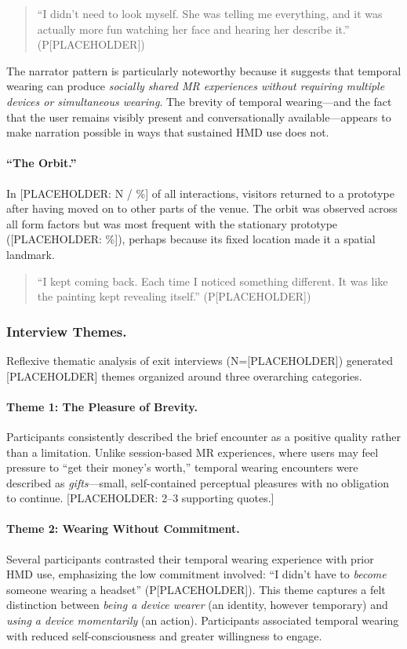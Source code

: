 \begin{quote}
``I didn't need to look myself. She was telling me everything, and it was actually more fun watching her face and hearing her describe it.'' (P[PLACEHOLDER])
\end{quote}

The narrator pattern is particularly noteworthy because it suggests that temporal wearing can produce \textit{socially shared MR experiences without requiring multiple devices or simultaneous wearing}. The brevity of temporal wearing---and the fact that the user remains visibly present and conversationally available---appears to make narration possible in ways that sustained HMD use does not.

\paragraph{``The Orbit.''}
In [PLACEHOLDER: N / \%] of all interactions, visitors returned to a prototype after having moved on to other parts of the venue. The orbit was observed across all form factors but was most frequent with the stationary prototype ([PLACEHOLDER: \%]), perhaps because its fixed location made it a spatial landmark.

\begin{quote}
``I kept coming back. Each time I noticed something different. It was like the painting kept revealing itself.'' (P[PLACEHOLDER])
\end{quote}

\subsubsection{Interview Themes.}
Reflexive thematic analysis of exit interviews (N=[PLACEHOLDER]) generated [PLACEHOLDER] themes organized around three overarching categories.

\paragraph{Theme 1: The Pleasure of Brevity.}
Participants consistently described the brief encounter as a positive quality rather than a limitation. Unlike session-based MR experiences, where users may feel pressure to ``get their money's worth,'' temporal wearing encounters were described as \textit{gifts}---small, self-contained perceptual pleasures with no obligation to continue. [PLACEHOLDER: 2--3 supporting quotes.]

\paragraph{Theme 2: Wearing Without Commitment.}
Several participants contrasted their temporal wearing experience with prior HMD use, emphasizing the low commitment involved: ``I didn't have to \textit{become} someone wearing a headset'' (P[PLACEHOLDER]). This theme captures a felt distinction between \textit{being a device wearer} (an identity, however temporary) and \textit{using a device momentarily} (an action). Participants associated temporal wearing with reduced self-consciousness and greater willingness to engage.

